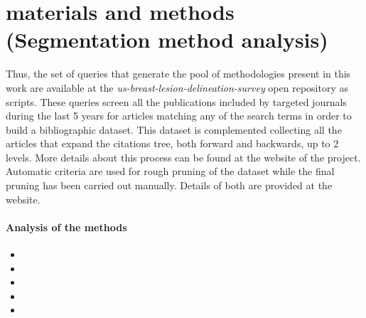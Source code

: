 \graphicspath{ {./content/analysis/figures/} }

\section{materials and methods (Segmentation method analysis)}

Thus, the set of queries that generate the pool of methodologies present in this work are available at the \emph{us-breast-lesion-delineation-survey} open repository as scripts.
These queries screen all the publications included by targeted journals during the last 5 years for articles matching any of the search terms in order to build a bibliographic dataset. This dataset is complemented collecting all the articles that expand the citations tree, both forward and backwards, up to 2 levels. More details about this process can be found at the website of the project. Automatic criteria are used for rough pruning of the dataset while the final pruning has been carried out manually. Details of both are provided at the website.

\paragraph{Analysis of the methods}
\label{sec:intro:analysis_of_the_methods}
\begin{itemize}
  \item {}
  \item {}
  \item {}
  \item {}
  \item {}
\end{itemize}


